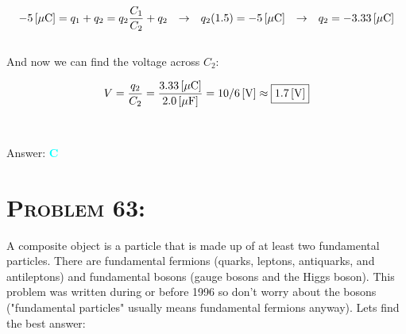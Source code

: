 \documentclass{article}
\begin{document}
\begin{gather}
\unit[-5]{[\mu C]} =  q_{1} + q_{2} = q_{2} \frac{C_{1}} {C_{2}}   + q_{2} \hspace{.1in} 
\rightarrow \hspace{.1in} q_{2} (1.5) = \unit[-5]{[\mu C]} \hspace{.1in} \rightarrow \hspace{.1in} q_{2} = \unit[-3.33]{[\mu C]}\nonumber
\end{gather}
\\
And now we can find the voltage across $C_{2}$:

\begin{gather}
V = \frac{q_{2}}{C_{2}} = \frac{\unit[3.33]{[\mu C]}}{\unit[2.0]{[\mu F]}} = \unit[10/6] {[V]} \approx \boxed{\unit[1.7] {[V]}}\nonumber
\end{gather}
\\\\
Answer: \textbf{\textcolor{cyan}C}\\


\section{\textsc{Problem 63:}} A composite object is a particle that is made up of at least two fundamental particles. There are fundamental fermions (quarks, leptons, antiquarks, and antileptons) and fundamental bosons (gauge bosons and the Higgs boson). This problem was written during or before 1996 so don't worry about the bosons ("fundamental particles" usually means fundamental fermions anyway). Lets find the best answer:
\end{document}
